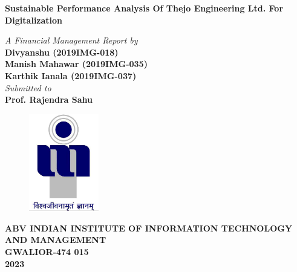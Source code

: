 \title{}
\author{}
\thispagestyle{empty}

\begin{titlepage}
\begin{center}
{\LARGE \bf Sustainable Performance Analysis Of
Thejo Engineering Ltd. For Digitalization} \\
\end{center}
\begin{center}
\vspace{0.6in}
{\large \it A Financial Management Report by} \\
\vspace{0.6in}
{\large \bf Divyanshu (2019IMG-018)}\\
{\large \bf Manish Mahawar (2019IMG-035)}\\
{\large \bf Karthik Ianala (2019IMG-037)}\\
\vspace{0.5in}
{\large \it Submitted to\\}
\vspace{0.3in}
{\large \bf Prof. Rajendra Sahu}\\

\end {center}
\vspace{0.8in}
\begin{figure}[h]
\centerline{\includegraphics[width=1.2in]{iiitm}}
\end{figure}
\begin{center}
{\Large \bf ABV INDIAN INSTITUTE OF INFORMATION TECHNOLOGY AND MANAGEMENT\\
GWALIOR-474 015\\}
\vspace{0.2in}
{\Large \bf 2023\\}
\end{center}
\end{titlepage}
